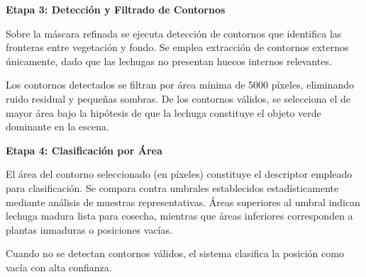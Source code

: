 \textbf{Etapa 3: Detección y Filtrado de Contornos}

Sobre la máscara refinada se ejecuta detección de contornos que identifica las fronteras entre vegetación y fondo. Se emplea extracción de contornos externos únicamente, dado que las lechugas no presentan huecos internos relevantes.

Los contornos detectados se filtran por área mínima de 5000 píxeles, eliminando ruido residual y pequeñas sombras. De los contornos válidos, se selecciona el de mayor área bajo la hipótesis de que la lechuga constituye el objeto verde dominante en la escena.

\textbf{Etapa 4: Clasificación por Área}

El área del contorno seleccionado (en píxeles) constituye el descriptor empleado para clasificación. Se compara contra umbrales establecidos estadísticamente mediante análisis de muestras representativas. Áreas superiores al umbral indican lechuga madura lista para cosecha, mientras que áreas inferiores corresponden a plantas inmaduras o posiciones vacías.

Cuando no se detectan contornos válidos, el sistema clasifica la posición como vacía con alta confianza.


